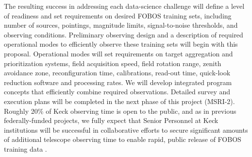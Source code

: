 \documentclass[oneside,11pt]{amsart}
\begin{document}
The resulting success in addressing each data-science challenge will
define a level of readiness and set requirements on desired FOBOS
training sets, including number of sources, pointings, magnitude limits,
signal-to-noise thresholds, and observing conditions.  Preliminary
observing design and a description of required operational modes to
efficiently observe these training sets will begin with this proposal.
Operational modes will set requirements on target aggregation and
prioritization systems, field acquisition speed, field rotation range,
zenith avoidance zone, reconfiguration time, calibrations, read-out
time, quick-look reduction software and processing rates.  We will
develop integrated program concepts that efficiently combine required
observations.  Detailed survey and execution plans will be completed in
the next phase of this project (MSRI-2).  Roughly 20\% of Keck observing
time is open to the public, and as in previous federally-funded
projects, we fully expect that Senior Personnel at Keck institutions
will be successful in collaborative efforts to secure significant
amounts of additional telescope observing time to enable rapid, public
release of FOBOS training data \citep[e.g.,][]{newman13}.


\end{document}
